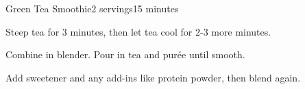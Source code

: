 \documentclass[../Cookbook.tex]{subfiles}
\begin{document}
\begin{recipe}{Green Tea Smoothie}{2 servings}{15 minutes}

Steep tea for 3 minutes, then let tea cool for 2-3 more minutes.

Combine in blender. Pour in tea and pur\'ee until smooth.

Add sweetener and any add-ins like protein powder, then blend again.

\end{recipe}
\end{document}
